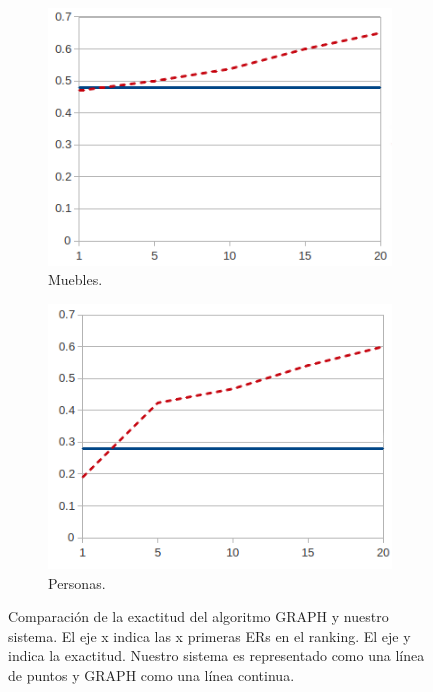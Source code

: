 \begin{figure}[h]
\begin{subfigure}{.5\textwidth}
  \centering
\includegraphics[width=\textwidth]{images/furniturePrec.png}
\caption{Muebles.}
\label{Tuna-scene-prec}

\end{subfigure}
\begin{subfigure}{.5\textwidth}
 \centering
  \centering
\includegraphics[width=\textwidth]{images/precP.png}
\caption{Personas.}
\end{subfigure}
\caption{Comparaci\'on de la exactitud  del algoritmo GRAPH y nuestro sistema. El eje x indica las x primeras ERs en el ranking. El eje y indica la exactitud. Nuestro sistema es representado como una l\'inea de puntos y GRAPH como una l\'inea continua.\label{graficoPresicion}}

\end{figure}

